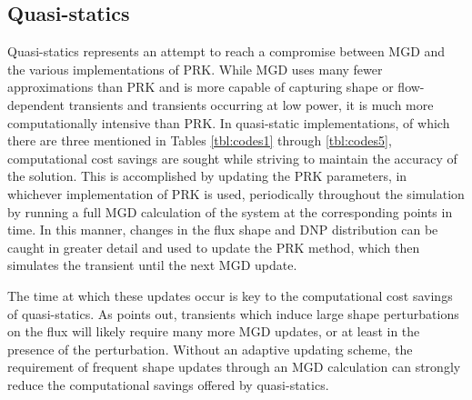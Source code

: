 \documentclass[review]{elsarticle}
\begin{document}
\subsection{Quasi-statics} \label{ssec:qs}
Quasi-statics represents an attempt to
reach a compromise between MGD and the various implementations of PRK. While
MGD uses many fewer approximations than PRK and is more capable of 
capturing shape or flow-dependent transients and transients occurring
at low power,
it is much more computationally intensive than PRK. In quasi-static
implementations, of which there are three mentioned in Tables \ref{tbl:codes1}
through \ref{tbl:codes5},
computational cost savings are sought while striving to maintain the accuracy
of the solution. This is accomplished by updating the PRK parameters, in
whichever implementation of PRK is used, periodically throughout the simulation
by running a full MGD calculation of the system at the corresponding points
in time. In this manner, changes in the flux shape and DNP distribution can
be caught in greater detail and used to update the PRK method, which then 
simulates the transient until the next MGD update.
\par The time at which these updates occur is key to the computational
 cost savings of
quasi-statics. As \cite{dulla_models_2005} points out, transients which induce
large shape perturbations on the flux will likely require many more MGD
updates, or at least in the presence of the perturbation. Without an adaptive
updating scheme, the requirement of frequent shape updates through an MGD
calculation can strongly reduce the computational savings offered by
quasi-statics.
\end{document}
